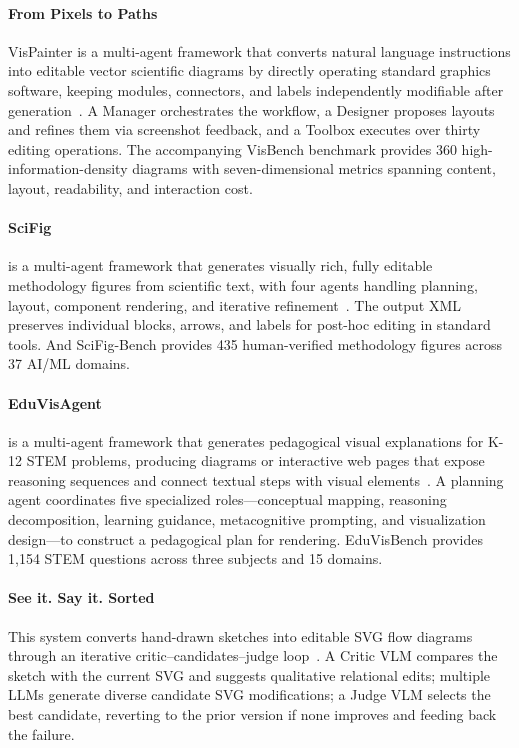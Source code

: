 \paragraph{From Pixels to Paths}
VisPainter is a multi-agent framework that converts natural language instructions into editable vector scientific diagrams by directly operating standard graphics software, keeping modules, connectors, and labels independently modifiable after generation~\cite{avg251027452}. A Manager orchestrates the workflow, a Designer proposes layouts and refines them via screenshot feedback, and a Toolbox executes over thirty editing operations. The accompanying VisBench benchmark provides 360 high-information-density diagrams with seven-dimensional metrics spanning content, layout, readability, and interaction cost.

\paragraph{SciFig}
 is a multi-agent framework that generates visually rich, fully editable methodology figures from scientific text, with four agents handling planning, layout, component rendering, and iterative refinement~\cite{huang2026scifig}. The output XML preserves individual blocks, arrows, and labels for post-hoc editing in standard tools. And SciFig-Bench provides 435 human-verified methodology figures across 37 AI/ML domains. 

\paragraph{EduVisAgent}
 is a multi-agent framework that generates pedagogical visual explanations for K-12 STEM problems, producing diagrams or interactive web pages that expose reasoning sequences and connect textual steps with visual elements~\cite{avg250516832}. A planning agent coordinates five specialized roles—conceptual mapping, reasoning decomposition, learning guidance, metacognitive prompting, and visualization design—to construct a pedagogical plan for rendering. EduVisBench provides 1,154 STEM questions across three subjects and 15 domains.

\paragraph{See it. Say it. Sorted}
This system converts hand-drawn sketches into editable SVG flow diagrams through an iterative critic–candidates–judge loop~\cite{avg250815222}. A Critic VLM compares the sketch with the current SVG and suggests qualitative relational edits; multiple LLMs generate diverse candidate SVG modifications; a Judge VLM selects the best candidate, reverting to the prior version if none improves and feeding back the failure.

